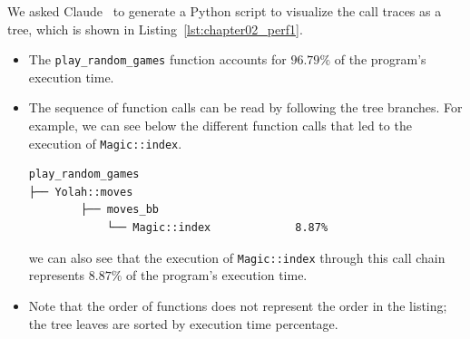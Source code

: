 \documentclass[12pt,a4paper,twoside,openright]{book}
\begin{document}
We asked Claude~\cite{anthropic2025claude} to generate a Python script to visualize the call traces as a tree, which is shown in Listing~\ref{lst:chapter02_perf1}.
\begin{itemize}
\item The \texttt{play_random_games} function accounts for $96.79\%$ of the program's execution time.
\item The sequence of function calls can be read by following the tree branches. For example, we can see below the different function calls that led to the execution of \texttt{Magic::index}.
\begin{verbatim}
play_random_games
├── Yolah::moves
        ├── moves_bb
            └── Magic::index             8.87%
\end{verbatim}
we can also see that the execution of \texttt{Magic::index} through this call chain represents $8.87\%$ of the program's execution time.
\item Note that the order of functions does not represent the order in the listing; the tree leaves are sorted by execution time percentage.

\end{itemize}
\end{document}
